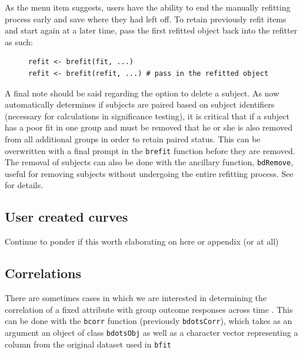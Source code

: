 As the menu item suggests, users have the ability to end the manually refitting process early and save where they had left off. To retain previously refit items and start again at a later time, pass the first refitted object back into the refitter as such:

\begin{singlespace}
\begin{figure}[H]
\centering
\begin{BVerbatim}
refit <- brefit(fit, ...)
refit <- brefit(refit, ...) # pass in the refitted object
\end{BVerbatim}
\end{figure}
\end{singlespace}



A final note should be said regarding the option to delete a subject. As  now automatically determines if subjects are paired based on subject identifiers (necessary for  calculations in significance testing), it is critical that if a subject has a poor fit in one group and must be removed that he or she is also removed from all additional groups in order to retain paired status. This can be overwritten with a final prompt in the \texttt{brefit} function before they are removed. The removal of subjects can also be done with the ancillary function, \texttt{bdRemove}, useful for removing subjects without undergoing the entire refitting process. See  for details.


\subsection{User created curves}

Continue to ponder if this worth elaborating on here or appendix (or at all)

\subsection{Correlations}

There are sometimes cases in which we are interested in determining the correlation of a fixed attribute with group outcome responses across time . This can be done with the \texttt{bcorr} function (previously \texttt{bdotsCorr}), which takes as an argument an object of class \texttt{bdotsObj} as well as a character vector representing a column from the original dataset used in \texttt{bfit}

